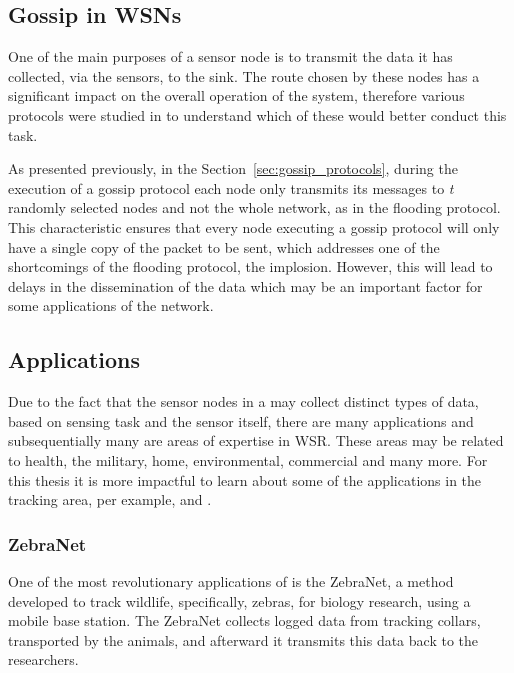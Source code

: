 

\subsection{Gossip in WSNs}
\label{subsec:gossip_in_wsns}
One of the main purposes of a sensor node is to transmit the data it has collected, via
the sensors, to the sink. The route chosen by these nodes has a significant impact on the
overall operation of the system, therefore various protocols were studied in \cite{Akkaya2005}
to understand which of these would better conduct this task.

As presented previously, in the Section~\ref{sec:gossip_protocols}, during the execution of a
gossip protocol each node only transmits its messages to \textit{t} randomly selected nodes
and not the whole network, as in the flooding protocol. This characteristic ensures that every
node executing a gossip protocol will only have a single copy of the packet to be sent, which
addresses one of the shortcomings of the flooding protocol, the implosion. %
However, this will lead to delays in the dissemination of the data which may be an important
factor for some applications of the network.


\subsection{Applications}
\label{subsec:wsn_applications}
Due to the fact that the sensor nodes in a  may collect distinct types of
data, based on sensing task and the sensor itself, there are many applications and
subsequentially many are areas of expertise in WSR. These areas may be related to health, the
military, home, environmental, commercial and many more. For this thesis it is more impactful
to learn about some of the applications in the tracking area, per example, 
and .

\subsubsection{ZebraNet}
\label{subsubsection:zebranet}
One of the most revolutionary applications of  is the ZebraNet\cite{Juang2002}, a method
developed to track wildlife, specifically, zebras, for biology research, using a mobile base
station. The ZebraNet collects logged data from tracking collars, transported by the
animals, and afterward it transmits this data back to the researchers.


